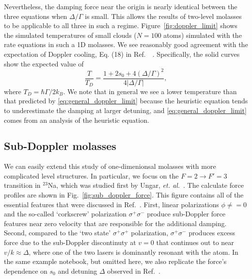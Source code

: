 \documentclass[final,5p,times,twocolumn]{elsarticle}
\begin{document}
Nevertheless, the damping force near the origin is nearly identical between the three equations when $\Delta/\Gamma$ is small.  This allows the results of two-level molasses~\cite{Lett1989} to be applicable to all three in such a regime.
Figure~\ref{fig:doppler_limit} shows the simulated temperatures of small clouds ($N=100$ atoms) simulated with the rate equations in such a 1D molasses.  We see reasonably good agreement with the expectation of Doppler cooling, Eq. (18) in Ref.~~\cite{Lett1989}.  Specifically, the solid curves show the expected value of 
\begin{equation}
	\label{eq:general_doppler_limit}
	\frac{T}{T_D} = \frac{1+2s_0+4(\Delta/\Gamma)^2}{4|\Delta/\Gamma|},
\end{equation}
where $T_D = \hbar \Gamma/2k_B$.  We note that in general we see a lower temperature than that predicted by \eqref{eq:general_doppler_limit} because 
the heuristic equation tends to underestimate the damping at larger detuning, and \eqref{eq:general_doppler_limit} comes from an analysis of the heuristic equation.

\subsection{Sub-Doppler molasses}
We can easily extend this study of one-dimenionsal molasses with more complicated level structures.  In particular, we focus on the $F=2\rightarrow F'=3$ transition in $^{23}$Na, which was studied first by Ungar, {\it et. al.}~\cite{Ungar1989}.  The calculate force profiles are shown in Fig.~\ref{fig:sub_doppler_force}.  This figure contains all of the essential features that were discussed in Ref.~\cite{Ungar1989}.  First, linear polarizations $\phi\neq=0$ and the so-called `corkscrew' polarization $\sigma^+\sigma^-$ produce sub-Doppler force features near zero velocity that are responsible for the additional damping.  Second, compared to the `two state' $\sigma^+\sigma^+$ polarization, $\sigma^+\sigma^-$ produces excess force due to the sub-Doppler discontinuty at $v=0$ that continues out to near $v/k\approx \Delta$, where one of the two lasers is dominantly resonant with the atom.  In the same example notebook, but omitted here, we also replicate the force's dependence on $s_0$ and detuning $\Delta$ observed in Ref.~\cite{Ungar1989}.
\end{document}
